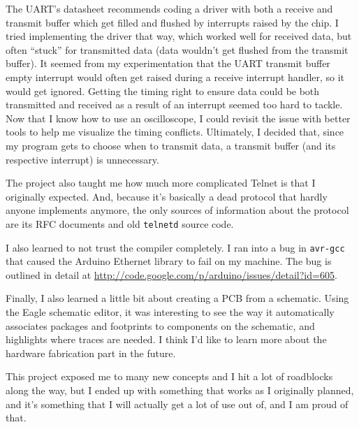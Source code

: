 \documentclass{amsart}
\begin{document}
The UART's datasheet recommends coding a driver with both a receive and transmit buffer which get filled and flushed by interrupts raised by the chip.  I tried implementing the driver that way, which worked well for received data, but often ``stuck'' for transmitted data (data wouldn't get flushed from the transmit buffer).  It seemed from my experimentation that the UART transmit buffer empty interrupt would often get raised during a receive interrupt handler, so it would get ignored.  Getting the timing right to ensure data could be both transmitted and received as a result of an interrupt seemed too hard to tackle.  Now that I know how to use an oscilloscope, I could revisit the issue with better tools to help me visualize the timing conflicts.  Ultimately, I decided that, since my program gets to choose when to transmit data, a transmit buffer (and its respective interrupt) is unnecessary.

The project also taught me how much more complicated Telnet is that I originally expected.  And, because it's basically a dead protocol that hardly anyone implements anymore, the only sources of information about the protocol are its RFC documents and old \texttt{telnetd} source code.

I also learned to not trust the compiler completely.  I ran into a bug in \texttt{avr-gcc} that caused the Arduino Ethernet library to fail on my machine.  The bug is outlined in detail at \url{http://code.google.com/p/arduino/issues/detail?id=605}.

Finally, I also learned a little bit about creating a PCB from a schematic.  Using the Eagle schematic editor, it was interesting to see the way it automatically associates packages and footprints to components on the schematic, and highlights where traces are needed.  I think I'd like to learn more about the hardware fabrication part in the future.

This project exposed me to many new concepts and I hit a lot of roadblocks along the way, but I ended up with something that works as I originally planned, and it's something that I will actually get a lot of use out of, and I am proud of that.
\end{document}
